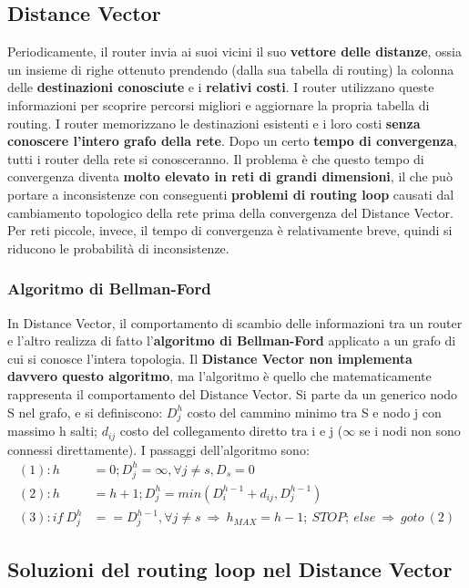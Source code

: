 \documentclass[12pt]{article}
\begin{document}
\subsection{Distance Vector}

Periodicamente, il router invia ai suoi vicini il suo \textbf{vettore delle distanze}, ossia un insieme di righe ottenuto prendendo (dalla sua tabella di routing) la colonna delle \textbf{destinazioni conosciute} e i \textbf{relativi costi}. I router utilizzano queste informazioni per scoprire percorsi migliori e aggiornare la propria tabella di routing. I router memorizzano le destinazioni esistenti e i loro costi \textbf{senza conoscere l'intero grafo della rete}. Dopo un certo \textbf{tempo di convergenza}, tutti i router della rete si conosceranno. Il problema è che questo tempo di convergenza diventa \textbf{molto elevato in reti di grandi dimensioni}, il che può portare a inconsistenze con conseguenti \textbf{problemi di routing loop} causati dal cambiamento topologico della rete prima della convergenza del Distance Vector. Per reti piccole, invece, il tempo di convergenza è relativamente breve, quindi si riducono le probabilità di inconsistenze.

\subsubsection{Algoritmo di Bellman-Ford}

In Distance Vector, il comportamento di scambio delle informazioni tra un router e l'altro realizza di fatto l'\textbf{algoritmo di Bellman-Ford} applicato a un grafo di cui si conosce l'intera topologia. Il \textbf{Distance Vector non implementa davvero questo algoritmo}, ma l'algoritmo è quello che matematicamente rappresenta il comportamento del Distance Vector. Si parte da un generico nodo S nel grafo, e si definiscono:
$D^h_j$ costo del cammino minimo tra S e nodo j con massimo h salti; $d_{ij}$ costo del collegamento diretto tra i e j ($\infty$ se i nodi non sono connessi direttamente). I passaggi dell'algoritmo sono:
\begin{align*}
    (1): h &= 0; D^h_j = \infty, \forall j \neq s, D_s = 0\\
    (2): h &= h + 1; D^h_j = min(D^{h-1}_i + d_{ij}, D^{h-1}_j)\\
    (3): if\ D^h_j &== D^{h-1}_j, \forall j \neq s\ \Rightarrow\ h_{MAX} = h - 1;\  STOP;\ else\ \Rightarrow\ goto\ (2)
\end{align*}

\subsection{Soluzioni del routing loop nel Distance Vector}
\end{document}
